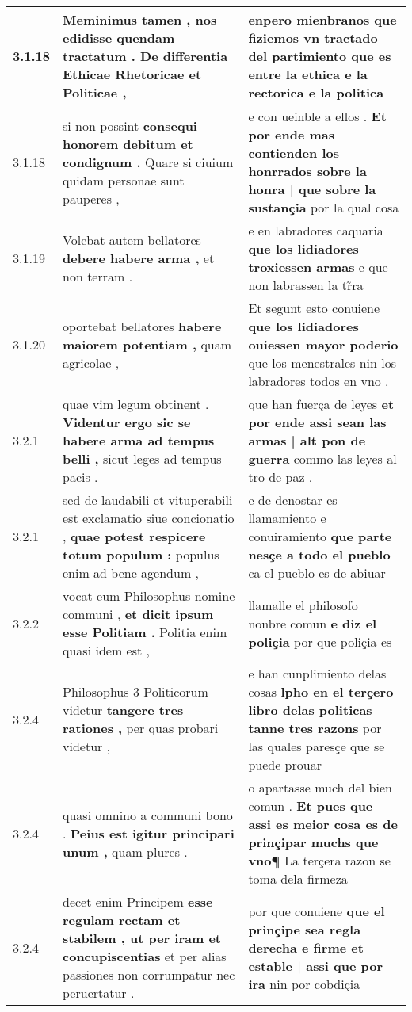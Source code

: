 \begin{tabular}{|p{1cm}|p{6.5cm}|p{6.5cm}|}
3.1.18 & Meminimus tamen , \textbf{ nos edidisse quendam tractatum . } De differentia Ethicae Rhetoricae et Politicae , & enpero mienbranos \textbf{ que fiziemos vn tractado del partimiento } que es entre la ethica e la rectorica e la politica \\\hline
3.1.18 & si non possint \textbf{ consequi honorem debitum et condignum . } Quare si ciuium quidam personae sunt pauperes , & e con ueinble a ellos . \textbf{ Et por ende mas contienden los honrrados sobre la honra | que sobre la sustançia } por la qual cosa \\\hline
3.1.19 & Volebat autem bellatores \textbf{ debere habere arma , } et non terram . & e en labradores caquaria \textbf{ que los lidiadores troxiessen armas } e que non labrassen la tr̃ra \\\hline
3.1.20 & oportebat bellatores \textbf{ habere maiorem potentiam , } quam agricolae , & Et segunt esto conuiene \textbf{ que los lidiadores ouiessen mayor poderio } que los menestrales nin los labradores todos en vno . \\\hline
3.2.1 & quae vim legum obtinent . \textbf{ Videntur ergo sic se habere arma ad tempus belli , } sicut leges ad tempus pacis . & que han fuerça de leyes \textbf{ et por ende assi sean las armas | alt pon de guerra } commo las leyes al tro de paz . \\\hline
3.2.1 & sed de laudabili et vituperabili est exclamatio siue concionatio , \textbf{ quae potest respicere totum populum : } populus enim ad bene agendum , & e de denostar es llamamiento e conuiramiento \textbf{ que parte nesçe a todo el pueblo } ca el pueblo es de abiuar \\\hline
3.2.2 & vocat eum Philosophus nomine communi , \textbf{ et dicit ipsum esse Politiam . } Politia enim quasi idem est , & llamalle el philosofo nonbre comun \textbf{ e diz el poliçia } por que poliçia es \\\hline
3.2.4 & Philosophus 3 Politicorum videtur \textbf{ tangere tres rationes , } per quas probari videtur , & e han cunplimiento delas cosas \textbf{ lpho en el terçero libro delas politicas tanne tres razons } por las quales paresçe que se puede prouar \\\hline
3.2.4 & quasi omnino a communi bono . \textbf{ Peius est igitur principari unum , } quam plures . & o apartasse much del bien comun . \textbf{ Et pues que assi es meior cosa es de prinçipar muchs que vno¶ } La terçera razon se toma dela firmeza \\\hline
3.2.4 & decet enim Principem \textbf{ esse regulam rectam et stabilem , ut per iram et concupiscentias } et per alias passiones non corrumpatur nec peruertatur . & por que conuiene \textbf{ que el prinçipe sea regla derecha e firme et estable | assi que por ira } nin por cobdiçia \\\hline

\end{tabular}

